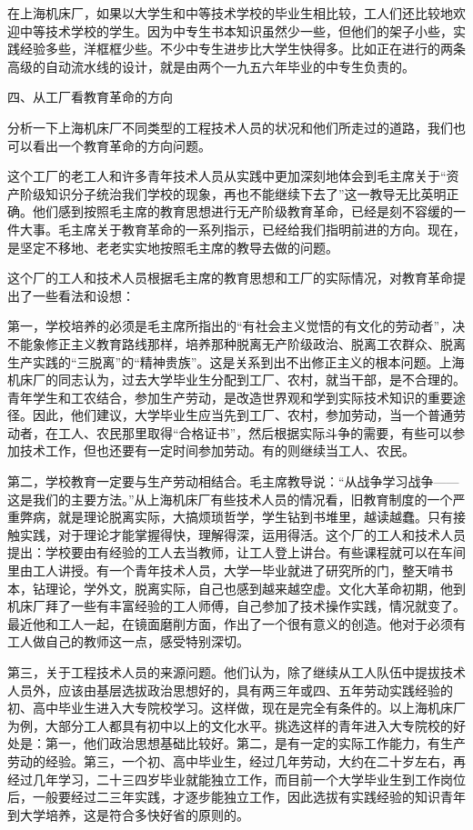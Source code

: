 \begin{maonote}
在上海机床厂，如果以大学生和中等技术学校的毕业生相比较，工人们还比较地欢迎中等技术学校的学生。因为中专生书本知识虽然少一些，但他们的架子小些，实践经验多些，洋框框少些。不少中专生进步比大学生快得多。比如正在进行的两条高级的自动流水线的设计，就是由两个一九五六年毕业的中专生负责的。

四、从工厂看教育革命的方向

分析一下上海机床厂不同类型的工程技术人员的状况和他们所走过的道路，我们也可以看出一个教育革命的方向问题。

这个工厂的老工人和许多青年技术人员从实践中更加深刻地体会到毛主席关于“资产阶级知识分子统治我们学校的现象，再也不能继续下去了”这一教导无比英明正确。他们感到按照毛主席的教育思想进行无产阶级教育革命，已经是刻不容缓的一件大事。毛主席关于教育革命的一系列指示，已经给我们指明前进的方向。现在，是坚定不移地、老老实实地按照毛主席的教导去做的问题。

这个厂的工人和技术人员根据毛主席的教育思想和工厂的实际情况，对教育革命提出了一些看法和设想：

第一，学校培养的必须是毛主席所指出的“有社会主义觉悟的有文化的劳动者”，决不能象修正主义教育路线那样，培养那种脱离无产阶级政治、脱离工农群众、脱离生产实践的“三脱离”的“精神贵族”。这是关系到出不出修正主义的根本问题。上海机床厂的同志认为，过去大学毕业生分配到工厂、农村，就当干部，是不合理的。青年学生和工农结合，参加生产劳动，是改造世界观和学到实际技术知识的重要途径。因此，他们建议，大学毕业生应当先到工厂、农村，参加劳动，当一个普通劳动者，在工人、农民那里取得“合格证书”，然后根据实际斗争的需要，有些可以参加技术工作，但也还要有一定时间参加劳动。有的则继续当工人、农民。

第二，学校教育一定要与生产劳动相结合。毛主席教导说：“从战争学习战争——这是我们的主要方法。”从上海机床厂有些技术人员的情况看，旧教育制度的一个严重弊病，就是理论脱离实际，大搞烦琐哲学，学生钻到书堆里，越读越蠢。只有接触实践，对于理论才能掌握得快，理解得深，运用得活。这个厂的工人和技术人员提出：学校要由有经验的工人去当教师，让工人登上讲台。有些课程就可以在车间里由工人讲授。有一个青年技术人员，大学一毕业就进了研究所的门，整天啃书本，钻理论，学外文，脱离实际，自己也感到越来越空虚。文化大革命初期，他到机床厂拜了一些有丰富经验的工人师傅，自己参加了技术操作实践，情况就变了。最近他和工人一起，在镜面磨削方面，作出了一个很有意义的创造。他对于必须有工人做自己的教师这一点，感受特别深切。

第三，关于工程技术人员的来源问题。他们认为，除了继续从工人队伍中提拔技术人员外，应该由基层选拔政治思想好的，具有两三年或四、五年劳动实践经验的初、高中毕业生进入大专院校学习。这样做，现在是完全有条件的。以上海机床厂为例，大部分工人都具有初中以上的文化水平。挑选这样的青年进入大专院校的好处是：第一，他们政治思想基础比较好。第二，是有一定的实际工作能力，有生产劳动的经验。第三，一个初、高中毕业生，经过几年劳动，大约在二十岁左右，再经过几年学习，二十三四岁毕业就能独立工作，而目前一个大学毕业生到工作岗位后，一般要经过二三年实践，才逐步能独立工作，因此选拔有实践经验的知识青年到大学培养，这是符合多快好省的原则的。


\end{maonote}
